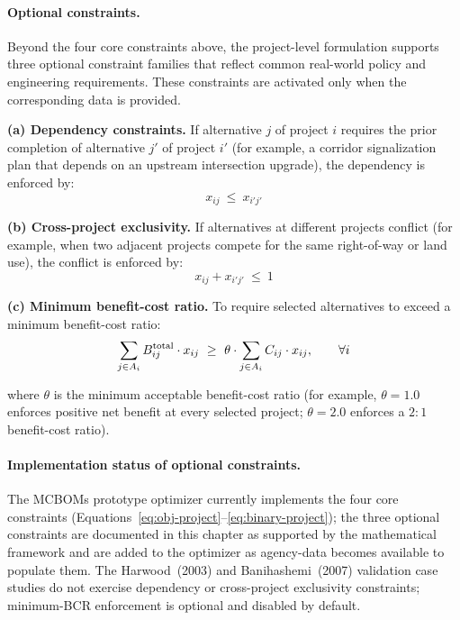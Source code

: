 \paragraph{Optional constraints.} Beyond the four core constraints above,
the project-level formulation supports three optional constraint families
that reflect common real-world policy and engineering requirements. These
constraints are activated only when the corresponding data is provided.

\textbf{(a) Dependency constraints.} If alternative $j$ of project $i$
requires the prior completion of alternative $j'$ of project $i'$ (for
example, a corridor signalization plan that depends on an upstream
intersection upgrade), the dependency is enforced by:
\begin{equation}
x_{ij}\ \leq\ x_{i'j'}
\label{eq:dependency}
\end{equation}

\textbf{(b) Cross-project exclusivity.} If alternatives at different
projects conflict (for example, when two adjacent projects compete for
the same right-of-way or land use), the conflict is enforced by:
\begin{equation}
x_{ij} + x_{i'j'}\ \leq\ 1
\label{eq:cross-exclusivity}
\end{equation}

\textbf{(c) Minimum benefit-cost ratio.} To require selected alternatives
to exceed a minimum benefit-cost ratio:
\begin{equation}
\sum_{j \in A_i} \Btot_{ij} \cdot x_{ij}\ \geq\ \theta \cdot \sum_{j \in A_i} C_{ij} \cdot x_{ij}, \qquad \forall i
\label{eq:min-bcr}
\end{equation}

\noindent where $\theta$ is the minimum acceptable benefit-cost ratio
(for example, $\theta = 1.0$ enforces positive net benefit at every
selected project; $\theta = 2.0$ enforces a $2{:}1$ benefit-cost ratio).

\paragraph{Implementation status of optional constraints.} The MCBOMs
prototype optimizer currently implements the four core constraints
(Equations~\ref{eq:obj-project}--\ref{eq:binary-project}); the three
optional constraints are documented in this chapter as supported by the
mathematical framework and are added to the optimizer as agency-data
becomes available to populate them. The Harwood~(2003) and
Banihashemi~(2007) validation case studies do not exercise dependency or
cross-project exclusivity constraints; minimum-BCR enforcement is
optional and disabled by default.

